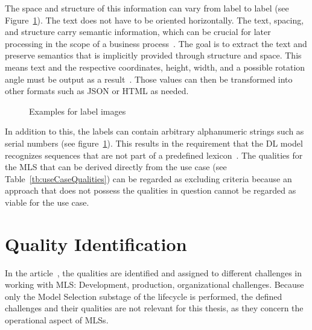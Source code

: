 The space and structure of this information can vary from label to label (see
Figure~\ref{fig:examples}).
The text does not have to be oriented horizontally.
The text, spacing, and structure carry semantic information, which can be crucial for later
processing in the scope of a business process~\citep{chen_text_2021}.
The goal is to extract the text and preserve semantics that is implicitly provided through
structure and space.
This means text and the respective coordinates, height, width, and a possible rotation angle must
be output as a result~\citep{yang_learning_2021}.
Those values can then be transformed into other formats such as JSON or HTML as needed.
\begin{figure}[h]
    \centering
    \caption{Examples for label images\label{fig:examples}}
\end{figure}

In addition to this, the labels can contain arbitrary alphanumeric strings such as serial numbers
(see figure~\ref{fig:examples}).
This results in the requirement that the \ac{DL} model recognizes sequences that
are not part of a predefined lexicon~\citep{ghosh_visual_2017,chen_text_2021}.
The qualities for the \ac{MLS} that can be derived directly from the use case (see
Table~\ref{tb:useCaseQualities}) can be regarded as excluding criteria because an approach
that does not possess the qualities in question cannot be regarded as viable for the use case.

\section{Quality Identification}
In the article~\cite{ashmore_assuring_2021}, the qualities are identified and assigned to different
challenges in working with \ac{MLS}: Development, production,
organizational challenges.
Because only the Model Selection substage of the lifecycle is performed, the defined challenges and
their qualities are not relevant for this thesis, as they concern the operational aspect of
\acp{MLS}.

